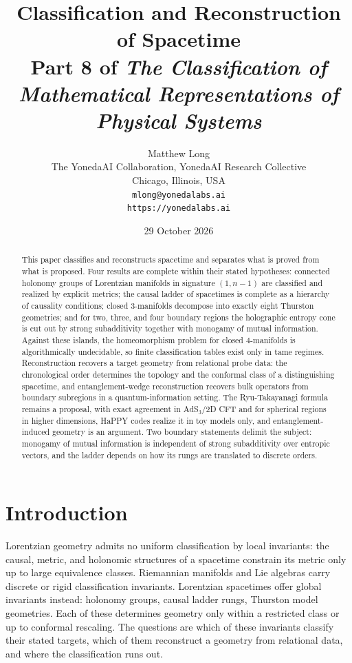 \documentclass[11pt,letterpaper]{article}
\title{Classification and Reconstruction of Spacetime\\[4pt]
  {\normalsize Part 8 of \emph{The Classification of Mathematical Representations of Physical Systems}}}
\author{Matthew Long\\
  \small The YonedaAI Collaboration, YonedaAI Research Collective\\
  \small Chicago, Illinois, USA\\
  \small \texttt{mlong@yonedalabs.ai}\\
  \small \texttt{https://yonedalabs.ai}}
\date{29 October 2026}
\theoremstyle{definition}
\theoremstyle{remark}
\begin{document}
\maketitle

\begin{abstract}
This paper classifies and reconstructs spacetime and separates what is proved from what is proposed. Four results are complete within their stated hypotheses: connected holonomy groups of Lorentzian manifolds in signature $(1,n-1)$ are classified and realized by explicit metrics; the causal ladder of spacetimes is complete as a hierarchy of causality conditions; closed 3-manifolds decompose into exactly eight Thurston geometries; and for two, three, and four boundary regions the holographic entropy cone is cut out by strong subadditivity together with monogamy of mutual information. Against these islands, the homeomorphism problem for closed 4-manifolds is algorithmically undecidable, so finite classification tables exist only in tame regimes. Reconstruction recovers a target geometry from relational probe data: the chronological order determines the topology and the conformal class of a distinguishing spacetime, and entanglement-wedge reconstruction recovers bulk operators from boundary subregions in a quantum-information setting. The Ryu-Takayanagi formula remains a proposal, with exact agreement in AdS$_3$/2D CFT and for spherical regions in higher dimensions, HaPPY codes realize it in toy models only, and entanglement-induced geometry is an argument. Two boundary statements delimit the subject: monogamy of mutual information is independent of strong subadditivity over entropic vectors, and the ladder depends on how its rungs are translated to discrete orders.
\end{abstract}

\section{Introduction}

Lorentzian geometry admits no uniform classification by local invariants: the causal, metric, and holonomic structures of a spacetime constrain its metric only up to large equivalence classes. Riemannian manifolds and Lie algebras carry discrete or rigid classification invariants. Lorentzian spacetimes offer global invariants instead: holonomy groups, causal ladder rungs, Thurston model geometries. Each of these determines geometry only within a restricted class or up to conformal rescaling. The questions are which of these invariants classify their stated targets, which of them reconstruct a geometry from relational data, and where the classification runs out.
\end{document}
